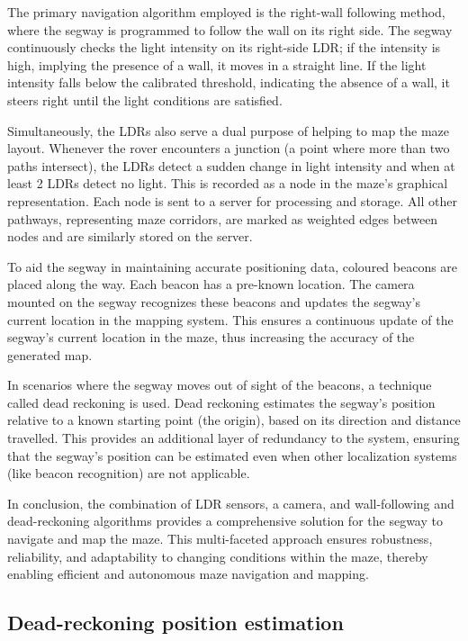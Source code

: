 The primary navigation algorithm employed is the right-wall following method, where the segway is programmed to follow the wall on its right side. The segway continuously checks the light intensity on its right-side LDR; if the intensity is high, implying the presence of a wall, it moves in a straight line. If the light intensity falls below the calibrated threshold, indicating the absence of a wall, it steers right until the light conditions are satisfied.

Simultaneously, the LDRs also serve a dual purpose of helping to map the maze layout. Whenever the rover encounters a junction (a point where more than two paths intersect), the LDRs detect a sudden change in light intensity and when at least 2 LDRs detect no light. This is recorded as a node in the maze's graphical representation. Each node is sent to a server for processing and storage. All other pathways, representing maze corridors, are marked as weighted edges between nodes and are similarly stored on the server.

To aid the segway in maintaining accurate positioning data, coloured beacons are placed along the way. Each beacon has a pre-known location. The camera mounted on the segway recognizes these beacons and updates the segway's current location in the mapping system. This ensures a continuous update of the segway's current location in the maze, thus increasing the accuracy of the generated map.

In scenarios where the segway moves out of sight of the beacons, a technique called dead reckoning is used. Dead reckoning estimates the segway's position relative to a known starting point (the origin), based on its direction and distance travelled. This provides an additional layer of redundancy to the system, ensuring that the segway's position can be estimated even when other localization systems (like beacon recognition) are not applicable.

In conclusion, the combination of LDR sensors, a camera, and wall-following and dead-reckoning algorithms provides a comprehensive solution for the segway to navigate and map the maze. This multi-faceted approach ensures robustness, reliability, and adaptability to changing conditions within the maze, thereby enabling efficient and autonomous maze navigation and mapping.

\subsection{Dead-reckoning position estimation}

